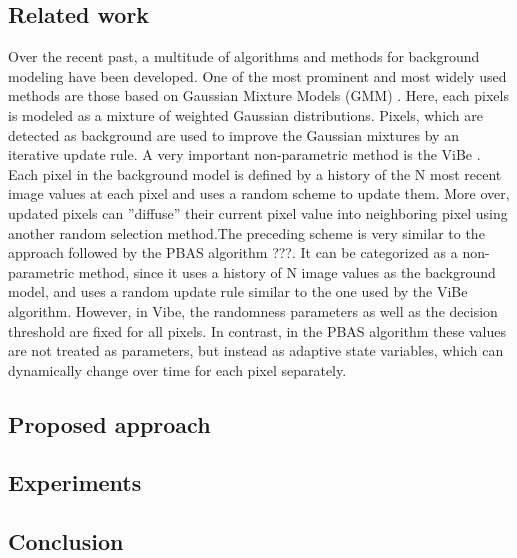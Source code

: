 \subsection*{Related work}
Over the recent past, a multitude of algorithms and methods for background modeling have been developed.
One of the most prominent and most widely used methods are those based on Gaussian Mixture Models (GMM)
\cite{gmm}. Here, each pixels is modeled as a mixture of weighted Gaussian distributions. Pixels, which are detected as background are used to improve the Gaussian mixtures by an iterative update rule. A very important non-parametric method is the ViBe \cite{vibe}. Each pixel in the background model is defined by a history of the N most recent image values at each pixel and uses a random scheme to update them. More over, updated pixels can ”diffuse” their current pixel value into neighboring pixel using another random selection method.The preceding scheme is very similar to the approach followed by the PBAS algorithm ???. It can be categorized as a non-parametric method, since it  uses a history of N image values as the background model, and uses a random update rule similar to the one used by the ViBe algorithm. However, in Vibe, the randomness parameters as well as the decision threshold are fixed for all pixels. In contrast, in the PBAS algorithm these values are not treated as parameters, but instead as adaptive state variables, which can dynamically change over time for each pixel separately.


\subsection*{Proposed approach}


\subsection*{Experiments}


\subsection*{Conclusion}



